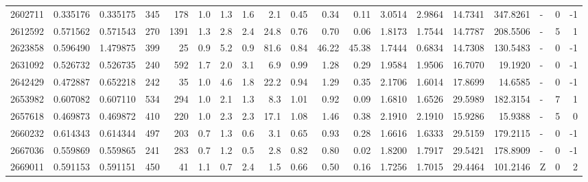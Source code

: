 \begin{tabular}{rrrrrrrrrrrrrrrrlrr}
   2602711 & 0.335176 &   0.335175 &  345 &  178 &      1.0 &      1.3 &     1.6 &      2.1 &       0.45 &        0.34 &        0.11 &  3.0514 &  2.9864 &   14.7341 &  347.8261 &             - &        0 &         -1 \\
   2612592 & 0.571562 &   0.571543 &  270 & 1391 &      1.3 &      2.8 &     2.4 &     24.8 &       0.76 &        0.70 &        0.06 &  1.8173 &  1.7544 &   14.7787 &  208.5506 &             - &        5 &          1 \\
   2623858 & 0.596490 &   1.479875 &  399 &   25 &      0.9 &      5.2 &     0.9 &     81.6 &       0.84 &       46.22 &       45.38 &  1.7444 &  0.6834 &   14.7308 &  130.5483 &             - &        0 &         -1 \\
   2631092 & 0.526732 &   0.526735 &  240 &  592 &      1.7 &      2.0 &     3.1 &      6.9 &       0.99 &        1.28 &        0.29 &  1.9584 &  1.9506 &   16.7070 &   19.1920 &             - &        0 &         -1 \\
   2642429 & 0.472887 &   0.652218 &  242 &   35 &      1.0 &      4.6 &     1.8 &     22.2 &       0.94 &        1.29 &        0.35 &  2.1706 &  1.6014 &   17.8699 &   14.6585 &             - &        0 &         -1 \\
   2653982 & 0.607082 &   0.607110 &  534 &  294 &      1.0 &      2.1 &     1.3 &      8.3 &       1.01 &        0.92 &        0.09 &  1.6810 &  1.6526 &   29.5989 &  182.3154 &             - &        7 &          1 \\
   2657618 & 0.469873 &   0.469872 &  410 &  220 &      1.0 &      2.3 &     2.3 &     17.1 &       1.08 &        1.46 &        0.38 &  2.1910 &  2.1910 &   15.9286 &   15.9388 &             - &        5 &          0 \\
   2660232 & 0.614343 &   0.614344 &  497 &  203 &      0.7 &      1.3 &     0.6 &      3.1 &       0.65 &        0.93 &        0.28 &  1.6616 &  1.6333 &   29.5159 &  179.2115 &             - &        0 &         -1 \\
   2667036 & 0.559869 &   0.559865 &  241 &  283 &      0.7 &      1.2 &     0.5 &      2.8 &       0.82 &        0.80 &        0.02 &  1.8200 &  1.7917 &   29.5421 &  178.8909 &             - &        0 &         -1 \\
   2669011 & 0.591153 &   0.591151 &  450 &   41 &      1.1 &      0.7 &     2.4 &      1.5 &       0.66 &        0.50 &        0.16 &  1.7256 &  1.7015 &   29.4464 &  101.2146 &             Z &        0 &          2 \\

\end{tabular}
